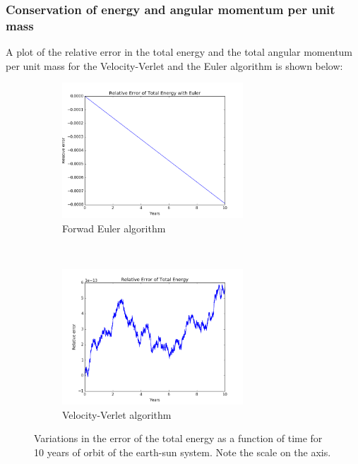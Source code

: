 \documentclass[a4paper, 10pt]{article}
\begin{document}
\subsubsection{Conservation of energy and angular momentum per unit mass}
A plot of the relative error in the total energy and the total angular momentum per unit mass for the Velocity-Verlet and the Euler algorithm is shown below:
\begin{figure}[!ht]
    \centering
    \begin{subfigure}[H!]{0.5\textwidth}
        \centering
        \includegraphics[height=2.0in]{relErrEnESEuler.png}
        \caption{Forwad Euler algorithm}
    \end{subfigure}%
    ~ 
    \begin{subfigure}[H!]{0.5\textwidth}
        \centering
        \includegraphics[height=2.0in]{relErEnES.png}
        \caption{Velocity-Verlet algorithm}
    \end{subfigure}
    \caption{Variations in the error of the total energy as a function of time for 10 years of orbit of the earth-sun system. Note the scale on the axis.}
\end{figure}
\end{document}
